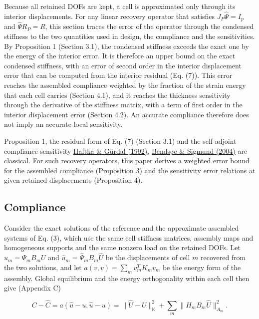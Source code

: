 \documentclass[preprint,12pt,authoryear]{elsarticle}
\begin{document}
Because all retained DOFs are kept, a cell is approximated only through its interior displacements. For any linear recovery operator that satisfies \(J_P\widehat\Psi=I_p\) and \(\widehat\Psi R_P=R\), this section traces the error of the operator through the condensed stiffness to the two quantities used in design, the compliance and the sensitivities. By Proposition 1 (Section 3.1), the condensed stiffness exceeds the exact one by the energy of the interior error. It is therefore an upper bound on the exact condensed stiffness, with an error of second order in the interior displacement error that can be computed from the interior residual (Eq. (7)). This error reaches the assembled compliance weighted by the fraction of the strain energy that each cell carries (Section 4.1), and it reaches the thickness sensitivity through the derivative of the stiffness matrix, with a term of first order in the interior displacement error (Section 4.2). An accurate compliance therefore does not imply an accurate local sensitivity.

Proposition 1, the residual form of Eq. (7) (Section 3.1) and the self-adjoint compliance sensitivity \href{https://doi.org/10.1007/978-94-011-2550-5}{Haftka \& Gürdal (1992)}, \href{https://doi.org/10.1007/978-3-662-05086-6}{Bendsøe \& Sigmund (2004)} are classical. For such recovery operators, this paper derives a weighted error bound for the assembled compliance (Proposition 3) and the sensitivity error relations at given retained displacements (Proposition 4).

\subsection{Compliance}

Consider the exact solutions of the reference and the approximate assembled systems of Eq. (3), which use the same cell stiffness matrices, assembly maps and homogeneous supports and the same nonzero load on the retained DOFs. Let \(u_m=\Psi_mB_mU\) and \(\widehat u_m=\widehat\Psi_mB_m\widehat U\) be the displacements of cell \(m\) recovered from the two solutions, and let \(a(v,v)=\sum_m v_m^TK_mv_m\) be the energy form of the assembly. Global equilibrium and the energy orthogonality within each cell then give (Appendix C)

\[
C-\widehat C
=a(\widehat u-u,\widehat u-u)
=\|\widehat U-U\|_{\mathbb K}^{2}
+\sum_m\|H_mB_m\widehat U\|_{A_m}^{2}.
\tag{14}
\]
\end{document}
